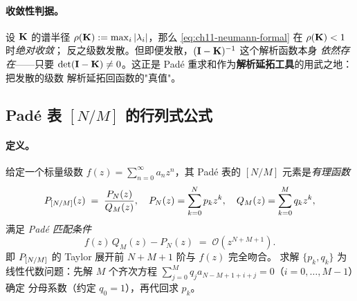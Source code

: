 \paragraph{收敛性判据。}
设 \(\mathbf{K}\) 的谱半径 \(\rho(\mathbf{K}) := \max_i |\lambda_i|\)，那么
\cref{eq:ch11-neumann-formal} 在 \(\rho(\mathbf{K}) < 1\) 时\emph{绝对收敛}；
反之级数发散。但即便发散，\((\mathbf{I} - \mathbf{K})^{-1}\) 这个解析函数本身
\emph{依然存在}——只要 \(\det(\mathbf{I} - \mathbf{K}) \ne 0\)。这正是
Padé 重求和作为\textbf{解析延拓工具}的用武之地：把发散的级数
解析延拓回函数的"真值"。

\subsection{Padé 表 \texorpdfstring{$[N/M]$}{[N/M]} 的行列式公式}
\label{subsec:ch11-pade-table}

\paragraph{定义。}
给定一个标量级数 \(f(z) = \sum_{n=0}^{\infty} a_n z^n\)，其
Padé 表的 \([N/M]\) 元素是\emph{有理函数}
\begin{equation}
\label{eq:ch11-pade-def}
P_{[N/M]}(z) \;=\; \frac{P_N(z)}{Q_M(z)},
\quad
P_N(z) = \sum_{k=0}^{N} p_k z^k,
\quad
Q_M(z) = \sum_{k=0}^{M} q_k z^k,
\end{equation}
满足 \emph{Padé 匹配条件}
\begin{equation}
\label{eq:ch11-pade-match}
f(z)\,Q_M(z) - P_N(z) \;=\; \mathcal{O}(z^{N+M+1}).
\end{equation}
即 \(P_{[N/M]}\) 的 Taylor 展开前 \(N+M+1\) 阶与 \(f(z)\) 完全吻合。
求解 \(\{p_k, q_k\}\) 为线性代数问题：先解 \(M\) 个齐次方程
\(\sum_{j=0}^{M} q_j a_{N-M+1+i+j} = 0\)（\(i = 0, \ldots, M-1\)）确定
分母系数（约定 \(q_0 = 1\)），再代回求 \(p_k\)。


